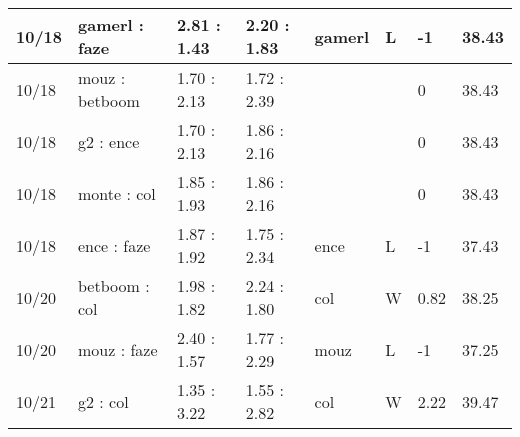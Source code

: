 \begin{small}
\begin{longtable}{|l|l|l|l|l|l|l|l|}
	10/18                               & gamerl : faze                       & 2.81 : 1.43                             & 2.20 : 1.83                             & gamerl                            & L                                 & -1                                   & 38.43                             \\ \hline
	10/18                               & mouz : betboom                      & 1.70 : 2.13                             & 1.72 : 2.39                             &                                   &                                   & 0                                    & 38.43                             \\ \hline
	10/18                               & g2 : ence                           & 1.70 : 2.13                             & 1.86 : 2.16                             &                                   &                                   & 0                                    & 38.43                             \\ \hline
	10/18                               & monte : col                         & 1.85 : 1.93                             & 1.86 : 2.16                             &                                   &                                   & 0                                    & 38.43                             \\ \hline
	10/18                               & ence : faze                         & 1.87 : 1.92                             & 1.75 : 2.34                             & ence                              & L                                 & -1                                   & 37.43                             \\ \hline
	10/20                               & betboom : col                       & 1.98 : 1.82                             & 2.24 : 1.80                             & col                               & W                                 & 0.82                                 & 38.25                             \\ \hline
	10/20                               & mouz : faze                         & 2.40 : 1.57                             & 1.77 : 2.29                             & mouz                              & L                                 & -1                                   & 37.25                             \\ \hline
	10/21                               & g2 : col                            & 1.35 : 3.22                             & 1.55 : 2.82                             & col                               & W                                 & 2.22                                 & 39.47                             \\ \hline

\end{longtable}
\end{small}
